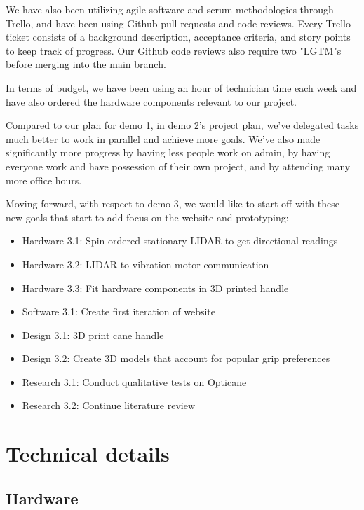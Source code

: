 \documentclass{article}
\begin{document}
We have also been utilizing agile software and scrum methodologies through Trello, and have been using Github pull requests and code reviews. Every Trello ticket consists of a background description, acceptance criteria, and story points to keep track of progress. Our Github code reviews also require two "LGTM"s before merging into the main branch.

In terms of budget, we have been using an hour of technician time each week and have also ordered the hardware components relevant to our project.

Compared to our plan for demo 1, in demo 2's project plan, we've delegated tasks much better to work in parallel and achieve more goals. We've also made significantly more progress by having less people work on admin, by having everyone work and have possession of their own project, and by attending many more office hours.

Moving forward, with respect to demo 3, we would like to start off with these new goals that start to add focus on the website and prototyping:
\begin{itemize}
  \item Hardware 3.1: Spin ordered stationary LIDAR to get directional readings
  \item Hardware 3.2: LIDAR to vibration motor communication
  \item Hardware 3.3: Fit hardware components in 3D printed handle
  \item Software 3.1: Create first iteration of website
  \item Design 3.1: 3D print cane handle
  \item Design 3.2: Create 3D models that account for popular grip preferences
  \item Research 3.1: Conduct qualitative tests on Opticane
  \item Research 3.2: Continue literature review
\end{itemize}

\section{Technical details}

\subsection{Hardware}
\end{document}
